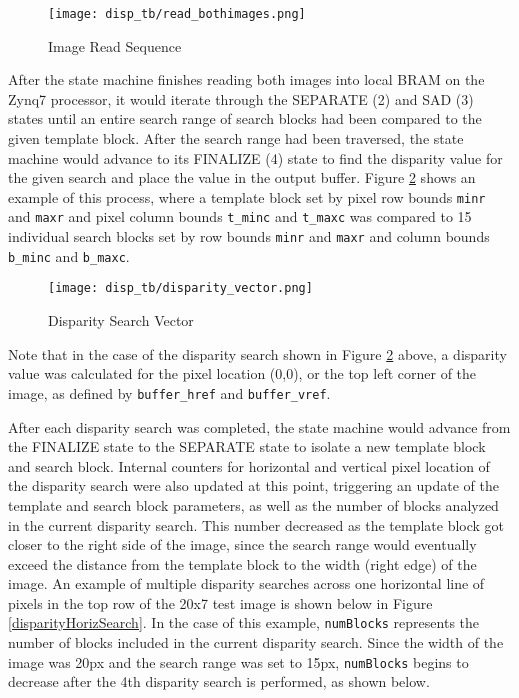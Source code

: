 \par
\begin{figure}[H]
	\centerline{\texttt{[image: disp\_tb/read\_bothimages.png]}}
	\caption{Image Read Sequence}
	\label{disparityImgRead}
\end{figure}
\par
After the state machine finishes reading both images into local BRAM on the Zynq7 processor, it would iterate through the SEPARATE (2) and SAD (3) states until an entire search range of search blocks had been compared to the given template block. After the search range had been traversed, the state machine would advance to its FINALIZE (4) state to find the disparity value for the given search and place the value in the output buffer. Figure \ref{disparityVector} shows an example of this process, where a template block set by pixel row bounds \texttt{minr} and \texttt{maxr} and pixel column bounds \texttt{t\_minc} and \texttt{t\_maxc} was compared to 15 individual search blocks set by row bounds \texttt{minr} and \texttt{maxr} and column bounds \texttt{b\_minc} and \texttt{b\_maxc}.
\par
\begin{figure}[H]
	\centerline{\texttt{[image: disp\_tb/disparity\_vector.png]}}
	\caption{Disparity Search Vector}
	\label{disparityVector}
\end{figure}
\par
Note that in the case of the disparity search shown in Figure \ref{disparityVector} above, a disparity value was calculated for the pixel location (0,0), or the top left corner of the image, as defined by \texttt{buffer\_href} and \texttt{buffer\_vref}.
\par
After each disparity search was completed, the state machine would advance from the FINALIZE state to the SEPARATE state to isolate a new template block and search block. Internal counters for horizontal and vertical pixel location of the disparity search were also updated at this point, triggering an update of the template and search block parameters, as well as the number of blocks analyzed in the current disparity search. This number decreased as the template block got closer to the right side of the image, since the search range would eventually exceed the distance from the template block to the width (right edge) of the image. An example of multiple disparity searches across one horizontal line of pixels in the top row of the 20x7 test image is shown below in Figure \ref{disparityHorizSearch}. In the case of this example, \texttt{numBlocks} represents the number of blocks included in the current disparity search. Since the width of the image was 20px and the search range was set to 15px, \texttt{numBlocks} begins to decrease after the 4th disparity search is performed, as shown below.
